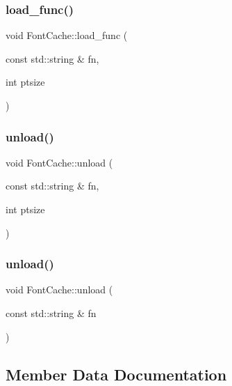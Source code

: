 \subsubsection{\texorpdfstring{load\_func()}{load\_func()}}
{\footnotesize\ttfamily void Font\+Cache\+::load\+\_\+func (\begin{DoxyParamCaption}\item[{const std\+::string \&}]{fn,  }\item[{int}]{ptsize }\end{DoxyParamCaption})\hspace{0.3cm}{\ttfamily [private]}}

\mbox{\label{classsage_1_1FontCache_a0d4b71fedf081cb72eab09dc53ea251f}} 
\subsubsection{\texorpdfstring{unload()}{unload()}\hspace{0.1cm}{\footnotesize\ttfamily [1/2]}}
{\footnotesize\ttfamily void Font\+Cache\+::unload (\begin{DoxyParamCaption}\item[{const std\+::string \&}]{fn,  }\item[{int}]{ptsize }\end{DoxyParamCaption})}

\mbox{\label{classsage_1_1FontCache_a7c166cbed37cfeee2ea02e698e6c58d0}} 
\subsubsection{\texorpdfstring{unload()}{unload()}\hspace{0.1cm}{\footnotesize\ttfamily [2/2]}}
{\footnotesize\ttfamily void Font\+Cache\+::unload (\begin{DoxyParamCaption}\item[{const std\+::string \&}]{fn }\end{DoxyParamCaption})}



\subsection{Member Data Documentation}
\mbox{\label{classsage_1_1FontCache_abe84a5350b1056e3ca812e5ac9d4928b}} 
